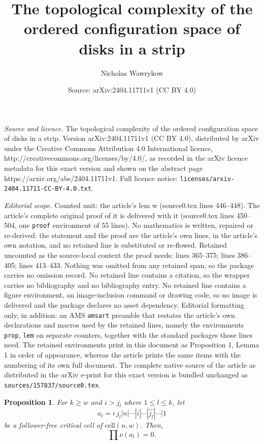 \documentclass[10pt,a4paper]{amsart}
\title{The topological complexity of the ordered configuration space of disks in a strip}
\author{Nicholas Wawrykow}
\date{Source: arXiv:2404.11711v1 (CC BY 4.0)}
\newtheorem{prop}{Proposition}
\begin{document}
\maketitle

\noindent\emph{Source and licence.} The topological complexity of the ordered configuration space of disks in a strip. Version arXiv:2404.11711v1 (CC BY 4.0), distributed by arXiv under the Creative Commons Attribution 4.0 International licence, http://creativecommons.org/licenses/by/4.0/, as recorded in the arXiv licence metadata for this exact version and shown on the abstract page https://arxiv.org/abs/2404.11711v1. Full licence notice: \texttt{licenses/arxiv-2404.11711-CC-BY-4.0.txt}.\par\smallskip

\noindent\textit{Editorial scope.} Counted unit: the article's lem w (source0.tex lines 446--448). The article's complete original proof of it is delivered with it (source0.tex lines 450--504, one \texttt{proof} environment of 55 lines). No mathematics is written, repaired or re-derived: the statement and the proof are the article's own lines, in the article's own notation, and no retained line is substituted or re-flowed.  Retained uncounted as the source-local context the proof needs: lines 365--375; lines 386--405; lines 413--433.  Nothing was omitted from any retained span, so the package carries no omission record.  No retained line contains a citation, so the wrapper carries no bibliography and no bibliography entry.  No retained line contains a figure environment, an image-inclusion command or drawing code, so no image is delivered and the package declares no asset dependency.  Editorial formatting only, in addition: an AMS \texttt{amsart} preamble that restates the article's own declarations and macros used by the retained lines, namely the environments \texttt{prop}, \texttt{lem} on separate counters, together with the standard packages those lines need.  The retained environments print in this document as Proposition 1, Lemma 1 in order of appearance, whereas the article prints the same items with the numbering of its own full document.  The complete native source of the article as distributed in the arXiv e-print for this exact version is bundled unchanged as \texttt{sources/157837/source0.tex}.
\begin{prop}\label{product of more than w-1 terms with same first is trivial}
For $k\ge w$ and $i>j_{l}$ where $1\le l\le k$, let
\[
a_{l}=i\, j_{l}|n|\cdots|\widehat{i}|\cdots|\widehat{j_{l}}|\cdots|1
\]
be a follower-free critical cell of $\text{cell}(n,w)$.
Then,
\[
\prod\nu(a_{l})=0.
\]
\end{prop}
\end{document}
